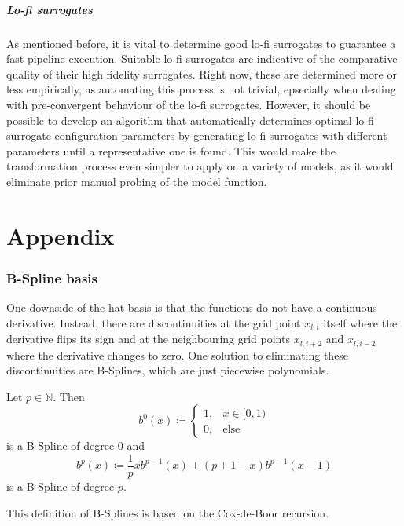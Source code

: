 \documentclass[
  a4paper,  %
  twoside,  %
  bibliography=totoc,
  headsepline,
  cleardoublepage=empty,
  parskip=half,
  draft=false
]{scrbook}
\begin{document}
\paragraph{Lo-fi surrogates}
As mentioned before, it is vital to determine good lo-fi surrogates to guarantee a fast pipeline execution.
Suitable lo-fi surrogates are indicative of the comparative quality of their high fidelity surrogates.
Right now, these are determined more or less empirically, as automating this process is not trivial, epsecially when dealing with pre-convergent behaviour of the lo-fi surrogates.
However, it should be possible to develop an algorithm that automatically determines optimal lo-fi surrogate configuration parameters by generating lo-fi surrogates with different parameters until a representative one is found.
This would make the transformation process even simpler to apply on a variety of models, as it would eliminate prior manual probing of the model function.

\appendix
\chapter{Appendix}

\subsection{B-Spline basis}

One downside of the hat basis is that the functions do not have a continuous derivative.
Instead, there are discontinuities at the grid point $x_{l,i}$ itself where the derivative flips its sign and at the neighbouring grid points $x_{l,i+2}$ and $x_{l,i-2}$ where the derivative changes to zero.
One solution to eliminating these discontinuities are B-Splines, which are just piecewise polynomials.
\begin{definition}[B-Splines]
Let $p \in \mathds{N}$.
Then
\begin{equation}
b^0(x) \coloneqq
\begin{cases}
    1, & x \in [0,1) \\
   0, & \text{else}
\end{cases}
\end{equation}
is a B-Spline of degree $0$ and
\begin{equation}
b^p(x) \coloneqq \frac{1}{p} xb^{p-1}(x) + (p + 1 - x) b^{p-1}(x-1) 
\end{equation}
is a B-Spline of degree $p$.
\end{definition}
This definition of B-Splines is based on the Cox-de-Boor recursion.
\end{document}
